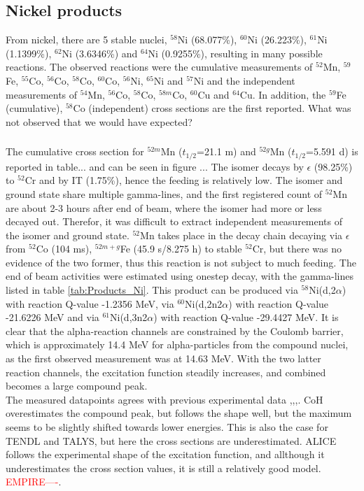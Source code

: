 \documentclass[a4paper,11pt,twoside]{book}
\begin{document}
\subsection{Nickel products}
From nickel, there are 5 stable nuclei, $^{58}$Ni (68.077\%), $^{60}$Ni (26.223\%), $^{61}$Ni (1.1399\%), $^{62}$Ni (3.6346\%) and $^{64}$Ni (0.9255\%), resulting in many possible reactions. The observed reactions were the cumulative measurements of $^{52}$Mn, $^{59}$Fe, $^{55}$Co, $^{56}$Co, $^{58}$Co, $^{60}$Co, $^{56}$Ni, $^{65}$Ni and $^{57}$Ni and the independent measurements of $^{54}$Mn, $^{56}$Co,  $^{58}$Co, $^{58m}$Co, $^{60}$Cu and $^{64}$Cu. In addition, the $^{59}$Fe (cumulative), $^{58}$Co (independent) cross sections are the first reported. What was not observed that we would have expected? 

\subsubsection{}
The cumulative cross section for $^{52m}$Mn ($t_{1/2}$=21.1 m) and $^{52g}$Mn ($t_{1/2}$=5.591 d) \cite{Dong2015} is reported in table... and can be seen in figure ... The isomer decays by $\epsilon$ (98.25\%) to $^{52}$Cr and by IT (1.75\%), hence the feeding is relatively low. The isomer and ground state share multiple gamma-lines, and the first registered count of $^{52}$Mn are about 2-3 hours after end of beam, where the isomer had more or less decayed out. Therefor, it was difficult to extract independent measurements of the isomer and ground state. $^{52}$Mn takes place in the decay chain decaying via $\epsilon$ from $^{52}$Co (104 ms), $^{52m+g}$Fe (45.9 s/8.275 h) to stable $^{52}$Cr, but there was no evidence of the two former, thus this reaction is not subject to much feeding. The end of beam activities were estimated using onestep decay, with the gamma-lines listed in table \ref{tab:Products_Ni}. This product can be produced via  $^{58}$Ni(d,2$\alpha$) with reaction Q-value -1.2356 MeV, via $^{60}$Ni(d,2n2$\alpha$) with reaction Q-value -21.6226  MeV and via $^{61}$Ni(d,3n2$\alpha$) with reaction Q-value -29.4427 MeV. It is clear that the alpha-reaction channels are constrained by the Coulomb barrier, which is approximately 14.4 MeV for alpha-particles from the compound nuclei, as the first observed measurement was at 14.63 MeV. With the two latter reaction channels, the excitation function steadily increases, and combined becomes a large compound peak. \\
\noindent 
The measured datapoints agrees with previous experimental data \cite{Hermanne2013},\cite{Takacs2007},\cite{Usman2016},\cite{Amjed2013}. CoH overestimates the compound peak, but follows the shape well, but the maximum seems to be slightly shifted towards lower energies. This is also the case for TENDL and TALYS, but here the cross sections are underestimated. ALICE follows the experimental shape of the excitation function, and allthough it underestimates the cross section values, it is still a relatively good model. \textcolor{red}{EMPIRE----}. 
\end{document}
